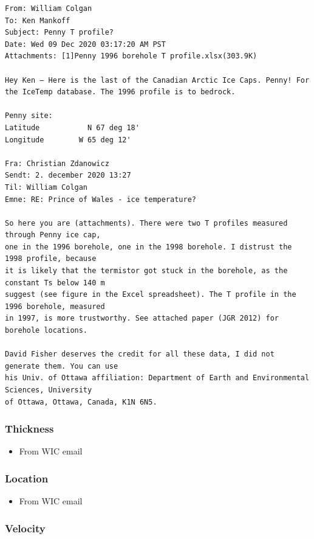 \documentclass[article,a4paper,times,11pt,twoside]{article}
\begin{document}
\begin{verbatim}
From: William Colgan
To: Ken Mankoff
Subject: Penny T profile?
Date: Wed 09 Dec 2020 03:17:20 AM PST
Attachments: [1]Penny 1996 borehole T profile.xlsx(303.9K)

Hey Ken – Here is the last of the Canadian Arctic Ice Caps. Penny! For the IceTemp database. The 1996 profile is to bedrock.

Penny site:
Latitude           N 67 deg 18'
Longitude        W 65 deg 12'

Fra: Christian Zdanowicz
Sendt: 2. december 2020 13:27
Til: William Colgan
Emne: RE: Prince of Wales - ice temperature?

So here you are (attachments). There were two T profiles measured through Penny ice cap,
one in the 1996 borehole, one in the 1998 borehole. I distrust the 1998 profile, because
it is likely that the termistor got stuck in the borehole, as the constant Ts below 140 m
suggest (see figure in the Excel spreadsheet). The T profile in the 1996 borehole, measured
in 1997, is more trustworthy. See attached paper (JGR 2012) for borehole locations.

David Fisher deserves the credit for all these data, I did not generate them. You can use
his Univ. of Ottawa affiliation: Department of Earth and Environmental Sciences, University
of Ottawa, Ottawa, Canada, K1N 6N5.
\end{verbatim}


\subsubsection{Thickness}
\label{sec:org3dc183f}

\begin{itemize}
\item From WIC email
\end{itemize}

\subsubsection{Location}
\label{sec:orgea8f30d}

\begin{itemize}
\item From WIC email
\end{itemize}

\subsubsection{Velocity}
\label{sec:org3a308d4}
\clearpage
\end{document}
